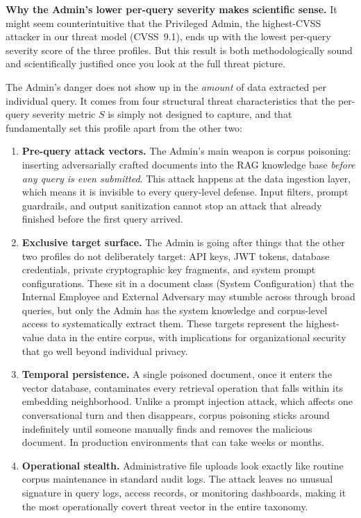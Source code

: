 \documentclass[12pt, a4paper]{article}
\begin{document}
\begin{notebox}
\textbf{Why the Admin's lower per-query severity makes scientific sense.}\quad
It might seem counterintuitive that the Privileged Admin, the highest-CVSS attacker in our threat model (CVSS~9.1), ends up with the lowest per-query severity score of the three profiles. But this result is both methodologically sound and scientifically justified once you look at the full threat picture.

The Admin's danger does not show up in the \emph{amount} of data extracted per individual query. It comes from four structural threat characteristics that the per-query severity metric $S$ is simply not designed to capture, and that fundamentally set this profile apart from the other two:

\begin{enumerate}[leftmargin=1.8em, itemsep=4pt]
  \item \textbf{Pre-query attack vectors.} The Admin's main weapon is corpus poisoning: inserting adversarially crafted documents into the RAG knowledge base \emph{before any query is even submitted}. This attack happens at the data ingestion layer, which means it is invisible to every query-level defense. Input filters, prompt guardrails, and output sanitization cannot stop an attack that already finished before the first query arrived.
  \item \textbf{Exclusive target surface.} The Admin is going after things that the other two profiles do not deliberately target: API keys, JWT tokens, database credentials, private cryptographic key fragments, and system prompt configurations. These sit in a document class (System Configuration) that the Internal Employee and External Adversary may stumble across through broad queries, but only the Admin has the system knowledge and corpus-level access to systematically extract them. These targets represent the highest-value data in the entire corpus, with implications for organizational security that go well beyond individual privacy.
  \item \textbf{Temporal persistence.} A single poisoned document, once it enters the vector database, contaminates every retrieval operation that falls within its embedding neighborhood. Unlike a prompt injection attack, which affects one conversational turn and then disappears, corpus poisoning sticks around indefinitely until someone manually finds and removes the malicious document. In production environments that can take weeks or months.
  \item \textbf{Operational stealth.} Administrative file uploads look exactly like routine corpus maintenance in standard audit logs. The attack leaves no unusual signature in query logs, access records, or monitoring dashboards, making it the most operationally covert threat vector in the entire taxonomy.
\end{enumerate}


\end{notebox}
\end{document}
